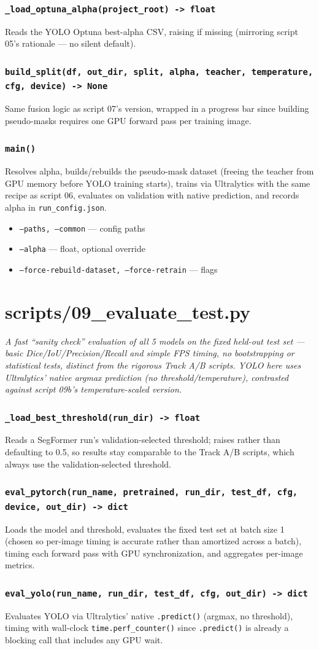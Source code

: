 \documentclass[11pt]{article}
\newcommand{\role}[1]{\par\noindent\textit{#1}\par\vspace{0.5em}}
\newcommand{\func}[1]{\subsubsection*{\texttt{#1}}}
\newcommand{\cliarg}[2]{\item \texttt{#1} --- #2}
\begin{document}
\func{\_load\_optuna\_alpha(project\_root) -> float}
Reads the YOLO Optuna best-alpha CSV, raising if missing (mirroring script 05's
rationale --- no silent default).

\func{build\_split(df, out\_dir, split, alpha, teacher, temperature, cfg, device) -> None}
Same fusion logic as script 07's version, wrapped in a progress bar since
building pseudo-masks requires one GPU forward pass per training image.

\func{main()}
Resolves alpha, builds/rebuilds the pseudo-mask dataset (freeing the teacher
from GPU memory before YOLO training starts), trains via Ultralytics with the
same recipe as script 06, evaluates on validation with native prediction, and
records alpha in \texttt{run\_config.json}.

\begin{itemize}[nosep]
\cliarg{--paths, --common}{config paths}
\cliarg{--alpha}{float, optional override}
\cliarg{--force-rebuild-dataset, --force-retrain}{flags}
\end{itemize}

\section{scripts/09\_evaluate\_test.py}
\role{A fast ``sanity check'' evaluation of all 5 models on the fixed held-out
test set --- basic Dice/IoU/Precision/Recall and simple FPS timing, no
bootstrapping or statistical tests, distinct from the rigorous Track A/B
scripts. YOLO here uses Ultralytics' native argmax prediction (no
threshold/temperature), contrasted against script 09b's temperature-scaled
version.}

\func{\_load\_best\_threshold(run\_dir) -> float}
Reads a SegFormer run's validation-selected threshold; raises rather than
defaulting to 0.5, so results stay comparable to the Track A/B scripts, which
always use the validation-selected threshold.

\func{eval\_pytorch(run\_name, pretrained, run\_dir, test\_df, cfg, device, out\_dir) -> dict}
Loads the model and threshold, evaluates the fixed test set at batch size 1
(chosen so per-image timing is accurate rather than amortized across a batch),
timing each forward pass with GPU synchronization, and aggregates per-image
metrics.

\func{eval\_yolo(run\_name, run\_dir, test\_df, cfg, out\_dir) -> dict}
Evaluates YOLO via Ultralytics' native \texttt{.predict()} (argmax, no
threshold), timing with wall-clock \texttt{time.perf\_counter()} since
\texttt{.predict()} is already a blocking call that includes any GPU wait.
\end{document}
